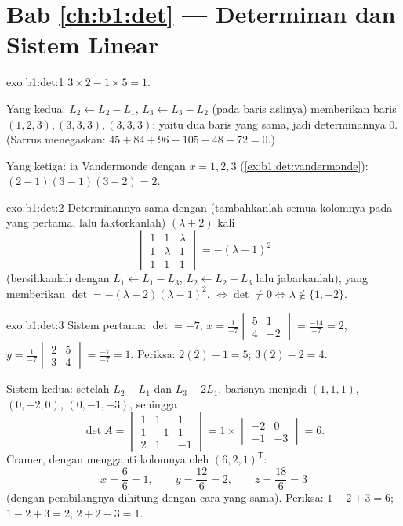 \section*{Bab \ref{ch:b1:det} --- Determinan dan Sistem Linear}

\begin{solution}{exo:b1:det:1}
$3 \times 2 - 1 \times 5 = 1$.

Yang kedua: $L_2 \leftarrow L_2 - L_1$, $L_3 \leftarrow L_3 - L_2$ (pada
baris aslinya) memberikan baris $(1,2,3), (3,3,3), (3,3,3)$: yaitu dua baris
yang sama, jadi determinannya $0$. (Sarrus menegaskan: $45 + 84 + 96 - 105 - 48 -
72 = 0$.)

Yang ketiga: ia Vandermonde dengan $x = 1, 2, 3$
(\cref{ex:b1:det:vandermonde}): $(2-1)(3-1)(3-2) = 2$.
\end{solution}

\begin{solution}{exo:b1:det:2}
Determinannya sama dengan (tambahkanlah semua kolomnya pada yang pertama, lalu faktorkanlah)
$(\lambda + 2)$ kali
\[
\begin{vmatrix}
1 & 1 & \lambda\\ 1 & \lambda & 1\\ 1 & 1 & 1
\end{vmatrix}
= -(\lambda - 1)^2
\]
(bersihkanlah dengan $L_1 \leftarrow L_1 - L_3$, $L_2 \leftarrow L_2 - L_3$
lalu jabarkanlah), yang memberikan $\det = -(\lambda+2)(\lambda-1)^2$. 
$\iff \det \neq 0 \iff \lambda \notin \{1, -2\}$.
\end{solution}

\begin{solution}{exo:b1:det:3}
Sistem pertama: $\det = -7$;
$x = \frac{1}{-7}\begin{vmatrix} 5 & 1\\ 4 & -2\end{vmatrix}
= \frac{-14}{-7} = 2$,
$y = \frac{1}{-7}\begin{vmatrix} 2 & 5\\ 3 & 4\end{vmatrix}
= \frac{-7}{-7} = 1$. Periksa: $2(2) + 1 = 5$; $3(2) - 2 = 4$.

Sistem kedua: setelah $L_2 - L_1$ dan $L_3 - 2L_1$, barisnya menjadi
$(1,1,1)$, $(0,-2,0)$, $(0,-1,-3)$, sehingga
\[
\det A = \begin{vmatrix} 1&1&1\\ 1&-1&1\\ 2&1&-1\end{vmatrix}
= 1 \times \begin{vmatrix} -2 & 0\\ -1 & -3\end{vmatrix} = 6 .
\]
Cramer, dengan mengganti kolomnya oleh $(6,2,1)^{\mathsf T}$:
\[
x = \frac{6}{6} = 1, \qquad
y = \frac{12}{6} = 2, \qquad
z = \frac{18}{6} = 3
\]
(dengan pembilangnya dihitung dengan cara yang sama). Periksa: $1 + 2 + 3 = 6$; $1 -
2 + 3 = 2$; $2 + 2 - 3 = 1$.
\end{solution}

